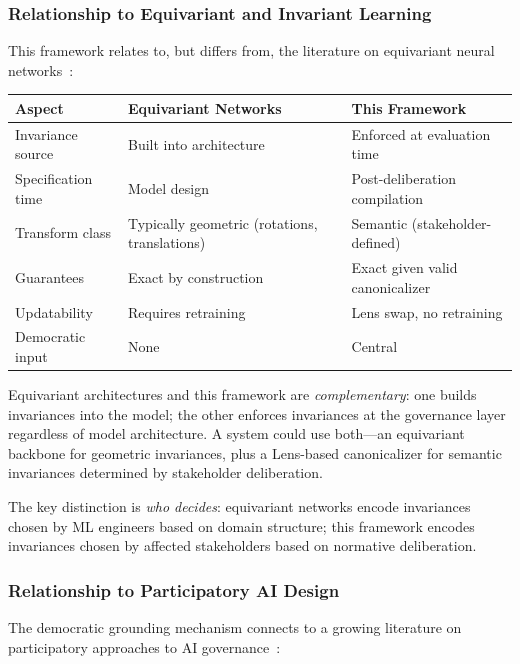 \documentclass[12pt]{article}
\begin{document}
\subsubsection{Relationship to Equivariant and Invariant Learning}

This framework relates to, but differs from, the literature on equivariant neural networks~\cite{cohen2016,bronstein2021}:

\begin{table}[h]
\centering
\begin{tabular}{lll}
\toprule
\textbf{Aspect} & \textbf{Equivariant Networks} & \textbf{This Framework} \\
\midrule
Invariance source & Built into architecture & Enforced at evaluation time \\
Specification time & Model design & Post-deliberation compilation \\
Transform class & Typically geometric (rotations, translations) & Semantic (stakeholder-defined) \\
Guarantees & Exact by construction & Exact given valid canonicalizer \\
Updatability & Requires retraining & Lens swap, no retraining \\
Democratic input & None & Central \\
\bottomrule
\end{tabular}
\end{table}

Equivariant architectures and this framework are \emph{complementary}: one builds invariances into
the model; the other enforces invariances at the governance layer regardless of model architecture.
A system could use both---an equivariant backbone for geometric invariances, plus a Lens-based
canonicalizer for semantic invariances determined by stakeholder deliberation.

The key distinction is \emph{who decides}: equivariant networks encode invariances chosen by ML
engineers based on domain structure; this framework encodes invariances chosen by affected stakeholders based on normative deliberation.

\subsubsection{Relationship to Participatory AI Design}

The democratic grounding mechanism connects to a growing literature on participatory approaches
to AI governance~\cite{sloane2022,birhane2022,lee2019}:
\end{document}
